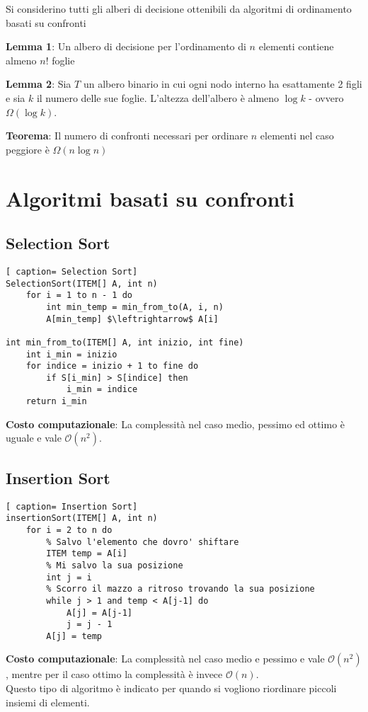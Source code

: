\documentclass[../cheatSheetAlgoritmi.tex]{subfiles}
\begin{document}
Si considerino tutti gli alberi di decisione ottenibili da algoritmi di ordinamento basati su confronti

\bigskip
\textbf{Lemma 1}: Un albero di decisione per l'ordinamento di $n$ elementi contiene almeno $n!$ foglie

\bigskip
\textbf{Lemma 2}: Sia $T$ un albero binario in cui ogni nodo interno ha esattamente 2 figli e sia $k$ il numero delle sue foglie. L'altezza dell'albero è almeno $\log k$ - ovvero $\Omega(\log k)$.

\bigskip
\textbf{Teorema}: Il numero di confronti necessari per ordinare $n$ elementi nel caso
peggiore è $\Omega(n \log n)$

\section{Algoritmi basati su confronti}
\subsection{Selection Sort}
\begin{lstlisting}[ caption= Selection Sort]
SelectionSort(ITEM[] A, int n)
	for i = 1 to n - 1 do
		int min_temp = min_from_to(A, i, n)
		A[min_temp] $\leftrightarrow$ A[i]

int min_from_to(ITEM[] A, int inizio, int fine)
	int i_min = inizio
  	for indice = inizio + 1 to fine do
		if S[i_min] > S[indice] then
			i_min = indice
	return i_min
\end{lstlisting}
\textbf{Costo computazionale}: La complessità nel caso medio, pessimo ed ottimo è uguale e vale $\mathcal{O}(n^{2})$.
\subsection{Insertion Sort}
\begin{lstlisting}[ caption= Insertion Sort]
insertionSort(ITEM[] A, int n)
	for i = 2 to n do
		% Salvo l'elemento che dovro' shiftare
		ITEM temp = A[i]
		% Mi salvo la sua posizione
		int j = i
		% Scorro il mazzo a ritroso trovando la sua posizione
		while j > 1 and temp < A[j-1] do
			A[j] = A[j-1]
			j = j - 1
		A[j] = temp
\end{lstlisting}
\textbf{Costo computazionale}: La complessità nel caso medio e pessimo  e vale $\mathcal{O}(n^{2})$, mentre per il caso ottimo la complessità è invece $\mathcal{O}(n)$. \\
Questo tipo di algoritmo è indicato per quando si vogliono riordinare piccoli insiemi di elementi.
 
\end{document}
